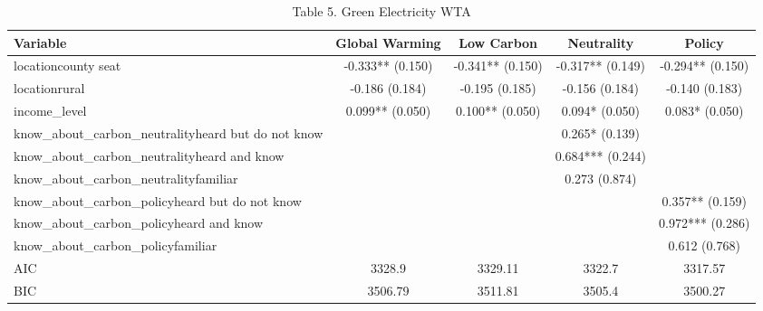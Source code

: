 \begin{table}[!htbp]
\centering
\caption{Table 5. Green Electricity WTA}
\begin{tabular}{lcccc}
\hline
Variable & Global Warming & Low Carbon & Neutrality & Policy \\
\hline
locationcounty seat & -0.333** (0.150) & -0.341** (0.150) & -0.317** (0.149) & -0.294** (0.150) \\
locationrural & -0.186 (0.184) & -0.195 (0.185) & -0.156 (0.184) & -0.140 (0.183) \\
income\_level & 0.099** (0.050) & 0.100** (0.050) & 0.094* (0.050) & 0.083* (0.050) \\
know\_about\_carbon\_neutralityheard but do not know &  &  & 0.265* (0.139) &  \\
know\_about\_carbon\_neutralityheard and know &  &  & 0.684*** (0.244) &  \\
know\_about\_carbon\_neutralityfamiliar &  &  & 0.273 (0.874) &  \\
know\_about\_carbon\_policyheard but do not know &  &  &  & 0.357** (0.159) \\
know\_about\_carbon\_policyheard and know &  &  &  & 0.972*** (0.286) \\
know\_about\_carbon\_policyfamiliar &  &  &  & 0.612 (0.768) \\
AIC & 3328.9 & 3329.11 & 3322.7 & 3317.57 \\
BIC & 3506.79 & 3511.81 & 3505.4 & 3500.27 \\
\hline
\end{tabular}
\end{table}
